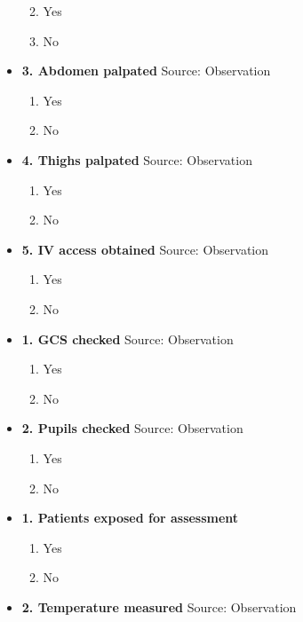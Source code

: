 \documentclass[
]{scrartcl}
\providecommand{\tightlist}{%
  \setlength{\itemsep}{0pt}\setlength{\parskip}{0pt}}\usepackage{longtable,booktabs,array}
\begin{document}
\begin{itemize}
  \begin{enumerate}
  \def\labelenumi{\arabic{enumi}.}
  \tightlist
  \item
    Yes
  \item
    No
  \end{enumerate}
\item
  \textbf{3. Abdomen palpated} Source: Observation

  \begin{enumerate}
  \def\labelenumi{\arabic{enumi}.}
  \tightlist
  \item
    Yes
  \item
    No
  \end{enumerate}
\item
  \textbf{4. Thighs palpated} Source: Observation

  \begin{enumerate}
  \def\labelenumi{\arabic{enumi}.}
  \tightlist
  \item
    Yes
  \item
    No
  \end{enumerate}
\item
  \textbf{5. IV access obtained} Source: Observation

  \begin{enumerate}
  \def\labelenumi{\arabic{enumi}.}
  \tightlist
  \item
    Yes
  \item
    No
  \end{enumerate}
\item
  \textbf{1. GCS checked} Source: Observation

  \begin{enumerate}
  \def\labelenumi{\arabic{enumi}.}
  \tightlist
  \item
    Yes
  \item
    No
  \end{enumerate}
\item
  \textbf{2. Pupils checked} Source: Observation

  \begin{enumerate}
  \def\labelenumi{\arabic{enumi}.}
  \tightlist
  \item
    Yes
  \item
    No
  \end{enumerate}
\item
  \textbf{1. Patients exposed for assessment}

  \begin{enumerate}
  \def\labelenumi{\arabic{enumi}.}
  \tightlist
  \item
    Yes
  \item
    No
  \end{enumerate}
\item
  \textbf{2. Temperature measured} Source: Observation


\end{itemize}
\end{document}

